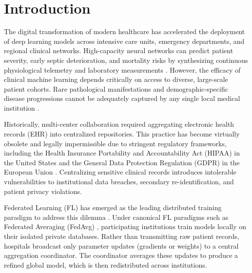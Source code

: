 \documentclass[conference]{IEEEtran}
\begin{document}
\section{Introduction}
The digital transformation of modern healthcare has accelerated the deployment of deep learning models across intensive care units, emergency departments, and regional clinical networks. High-capacity neural networks can predict patient severity, early septic deterioration, and mortality risks by synthesizing continuous physiological telemetry and laboratory measurements \cite{rieke2020future, sheller2020federated}. However, the efficacy of clinical machine learning depends critically on access to diverse, large-scale patient cohorts. Rare pathological manifestations and demographic-specific disease progressions cannot be adequately captured by any single local medical institution \cite{kaissis2020secure}.

Historically, multi-center collaboration required aggregating electronic health records (EHR) into centralized repositories. This practice has become virtually obsolete and legally impermissible due to stringent regulatory frameworks, including the Health Insurance Portability and Accountability Act (HIPAA) in the United States and the General Data Protection Regulation (GDPR) in the European Union \cite{rieke2020future, kaissis2020secure}. Centralizing sensitive clinical records introduces intolerable vulnerabilities to institutional data breaches, secondary re-identification, and patient privacy violations.

Federated Learning (FL) has emerged as the leading distributed training paradigm to address this dilemma \cite{mcmahan2017communication, kairouz2021advances, yang2019federated}. Under canonical FL paradigms such as Federated Averaging (FedAvg) \cite{mcmahan2017communication}, participating institutions train models locally on their isolated private databases. Rather than transmitting raw patient records, hospitals broadcast only parameter updates (gradients or weights) to a central aggregation coordinator. The coordinator averages these updates to produce a refined global model, which is then redistributed across institutions.
\end{document}
